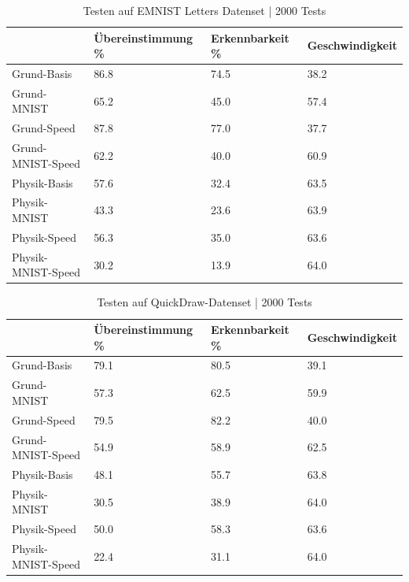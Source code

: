 \begin{table}[!ht]
    \centering
    \caption{Testen auf EMNIST Letters Datenset | 2000 Tests}
    \begin{tabular}{|l|l|l|l|}
    \hline
        ~ & Übereinstimmung \% & Erkennbarkeit \% & Geschwindigkeit \\ \hline
        Grund-Basis & 86.8 & 74.5 & 38.2 \\ \hline
        Grund-MNIST & 65.2 & 45.0 & 57.4 \\ \hline
        Grund-Speed & 87.8 & 77.0 & 37.7 \\ \hline
        Grund-MNIST-Speed & 62.2 & 40.0 & 60.9 \\ \hline
        Physik-Basis & 57.6 & 32.4 & 63.5 \\ \hline
        Physik-MNIST & 43.3 & 23.6 & 63.9 \\ \hline
        Physik-Speed & 56.3 & 35.0 & 63.6 \\ \hline
        Physik-MNIST-Speed & 30.2 & 13.9 & 64.0 \\ \hline
    \end{tabular}
    \label{tab:EMNIST}
\end{table}

\begin{table}[!ht]
    \centering
    \caption{Testen auf QuickDraw-Datenset | 2000 Tests}
    \begin{tabular}{|l|l|l|l|}
    \hline
        ~ & Übereinstimmung \% & Erkennbarkeit \% & Geschwindigkeit \\ \hline
        Grund-Basis & 79.1 & 80.5 & 39.1 \\ \hline
        Grund-MNIST & 57.3 & 62.5 & 59.9 \\ \hline
        Grund-Speed & 79.5 & 82.2 & 40.0 \\ \hline
        Grund-MNIST-Speed & 54.9 & 58.9 & 62.5 \\ \hline
        Physik-Basis & 48.1 & 55.7 & 63.8 \\ \hline
        Physik-MNIST & 30.5 & 38.9 & 64.0 \\ \hline
        Physik-Speed & 50.0 & 58.3 & 63.6 \\ \hline
        Physik-MNIST-Speed & 22.4 & 31.1 & 64.0 \\ \hline
    \end{tabular}
    \label{tab:Quickdraw}
\end{table}

\newpage

